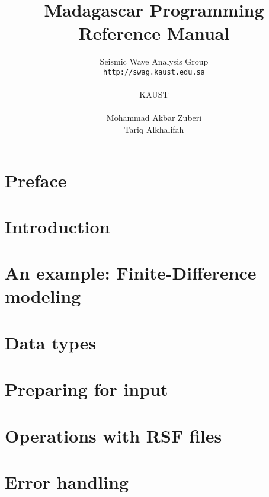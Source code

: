 \documentclass[10pt]{book}
\title{Madagascar Programming Reference Manual}
\author{Seismic Wave Analysis Group\\
               \texttt{http://swag.kaust.edu.sa}\\
               \\KAUST\\
               \\
               Mohammad Akbar Zuberi\\
               Tariq Alkhalifah}
\date{}                                           %
\begin{document}
\maketitle
\cleardoublepage

\tableofcontents{}
\cleardoublepage

\chapter*{Preface}


\chapter{Introduction}


\chapter{An example: Finite-Difference modeling}



\chapter{Data types}\label{sec:datatypes}
  

\chapter{Preparing for input}\label{sec:input}
   
\chapter{Operations with RSF files}\label{sec:files}

\chapter{Error handling}\label{sec:error}
\end{document}
